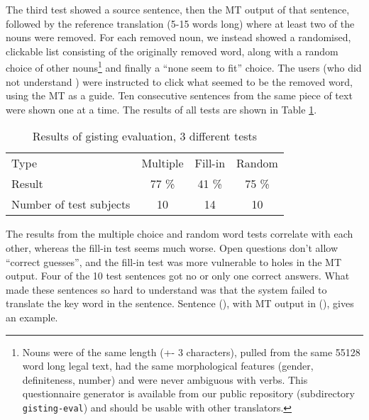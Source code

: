 \documentclass{book}
\begin{document}
The third test showed a \sme{} source sentence, then the MT output of
that sentence, followed by the reference translation (5-15 words long)
where at least two of the nouns were removed. For each removed noun,
we instead showed a randomised, clickable list consisting of the
originally removed word, along with a random choice of other
nouns\footnote{Nouns were of the same length (+- 3 characters), pulled
  from the same 55128 word long legal text, had the same morphological
  features (gender, definiteness, number) and were never ambiguous
  with verbs. This questionnaire generator is available from our
  public repository (subdirectory \texttt{gisting-eval}) and should be
  usable with other translators.} and finally a ``none seem to fit''
choice. The users (who did not understand \sme{}) were instructed to
click what seemed to be the removed word, using the MT as a guide. Ten
consecutive sentences from the same piece of text were shown one at a
time. The results of all tests are shown in Table \ref{eval}.

\begin{table}[htdp]
\caption{Results of gisting evaluation, 3 different tests}
\begin{center}
\begin{tabular}{lccc}
Type & Multiple & Fill-in & Random \\
Result & 77 \% & 41 \% & 75 \% \\
Number of test subjects & 10 & 14  & 10  \\
\end{tabular}
\end{center}
\label{eval}
\end{table}%



The results from the multiple choice and random word tests correlate
with each other, whereas the fill-in test seems much worse. Open
questions don't allow ``correct guesses'', and the fill-in test was
more vulnerable to holes in the MT output. Four of the 10 test
sentences got no or only one correct answers. What made these
sentences so hard to understand was that the system failed to
translate the key word in the sentence. Sentence (), with \nob{}
MT output in (), gives an example.
\end{document}
